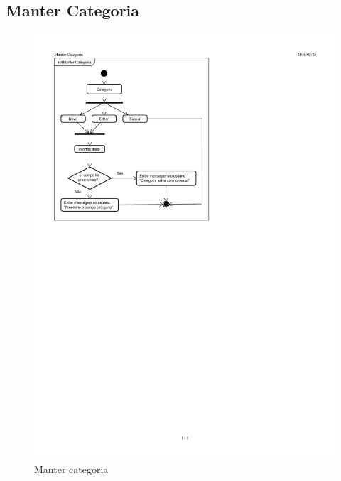 \documentclass[chapter=TITLE,12pt,oneside,a4paper,english,french,sumario=tradicional,spanish,brazil,]{abntex2}
\begin{document}
\subsection{Manter Categoria}
\begin{figure}[h]\centering
	\includegraphics[scale=1.61]{categoria.pdf}\caption{Manter categoria}
\end{figure}

\newpage
\end{document}

